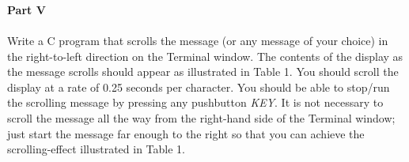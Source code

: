 \documentclass[epsfig,10pt,fullpage]{article}
\begin{document}
~\\
~\\
~\\
\noindent
{\bf Part V}
~\\
~\\
\noindent
Write a C program that scrolls the message  (or any message of your choice) 
in the right-to-left direction on the Terminal window. The contents of the display as the message scrolls
should appear as illustrated in Table 1. You should scroll the display at a rate of 
0.25 seconds per character.  You should be able to stop/run the scrolling message by pressing 
any pushbutton {\it KEY}.
It is not necessary to scroll the message all the way from the right-hand side of the
Terminal window; just start the message far enough to the right so that you can achieve 
the scrolling-effect illustrated in Table 1.
~\\
~\\
\end{document}
